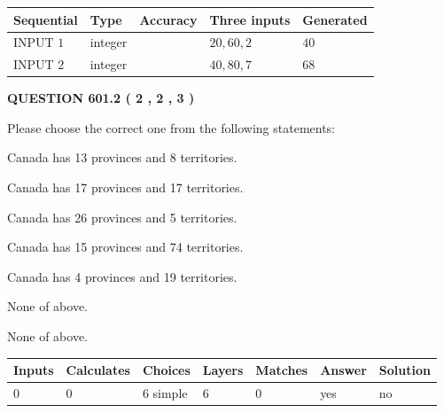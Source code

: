 \documentclass[12pt]{article}
\begin{document}
  
\noindent\begin{tabular}{|l|l|l|l|l|}
\hline
 Sequential & Type & Accuracy & Three inputs & Generated \\ 
\hline
 
 
  INPUT $  1 $ & integer &  & $
 20
 , 
 60
 , 
 2
 $ & $ 40 $ 
 \\  \hline  
 
 
  INPUT $  2 $ & integer &  & $
 40
 , 
 80
 , 
 7
 $ & $ 68 $ 
 \\  \hline  
 \end{tabular}
   
   
  
\vspace{0.2in}
  
{\textbf{\Large{QUESTION
601.2 
 ( 2 , 2 , 3 )
}}}
  
  
Please choose the correct one from the following statements:
 
 
Canada has  13 provinces and  8 territories.
 
 
Canada has  17 provinces and  17 territories.
 
 
Canada has  26 provinces and  5 territories.
 
 
Canada has  15 provinces and  74 territories.
 
 
Canada has   4 provinces and  19 territories.
 
 
 None of above.
 
 
\noindent{}
 
 
 None of above.
 
 
\noindent{}
 
 
   
   
   
   
\noindent\begin{tabular}{|l|l|l|l|l|l|l|}
 \hline
Inputs & Calculates & Choices & Layers & Matches & Answer & Solution \\ \hline
 0  & 
 0  & 
 6
  simple  
  & 
 6  & 
 0  & 
  yes & 
  no 
  \\ \hline
 \end{tabular}
   
\end{document}
